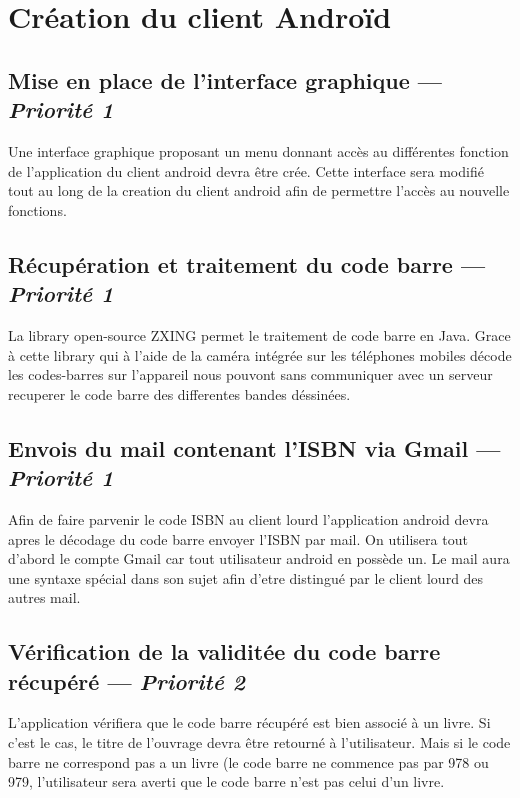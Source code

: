 \section{Création du client Androïd}


\subsection[Mise en place de l'interface graphique]{Mise en place de l'interface graphique  — \emph{Priorité 1}}
Une interface graphique proposant un menu donnant accès au différentes fonction de l'application du client android devra être crée. Cette interface sera modifié tout au long de la creation du client android afin de permettre l'accès au nouvelle fonctions.

\subsection[Récupération et traitement du code barre]{Récupération et traitement du code barre — \emph{Priorité 1}}
La library open-source ZXING permet le traitement de code barre en Java. Grace à cette library qui à l'aide de la caméra intégrée sur les téléphones mobiles décode les codes-barres sur l'appareil nous pouvont sans communiquer avec un serveur recuperer le code barre des differentes bandes déssinées.

\subsection[Envois du mail contenant l'ISBN via Gmail]{Envois du mail contenant l'ISBN via Gmail — \emph{Priorité 1}}
Afin de faire parvenir le code ISBN au client lourd l'application android devra apres le décodage du code barre envoyer l'ISBN par mail. On utilisera tout d'abord le compte Gmail car tout utilisateur android en possède un. Le mail aura une syntaxe spécial dans son sujet afin d'etre distingué par le client lourd des autres mail.


\subsection[Vérification de la validitée du code barre récupéré]{Vérification de la validitée du code barre récupéré — \emph{Priorité 2}}
L'application vérifiera que le code barre récupéré est bien associé à un livre. Si c'est le cas, le titre de l'ouvrage devra être retourné à l'utilisateur. Mais si le code barre ne correspond pas a un livre (le code barre ne commence pas par 978 ou 979, l'utilisateur sera averti que le code barre n'est pas celui d'un livre.

